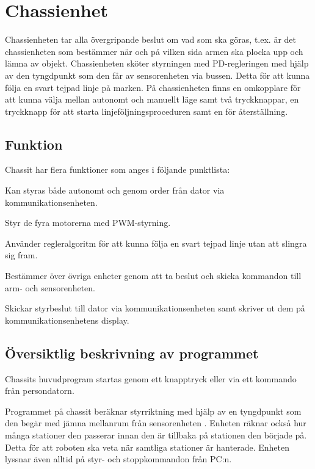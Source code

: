 \section{Chassienhet}
Chassienheten tar alla övergripande beslut om vad som ska göras, t.ex. är det chassienheten som bestämmer när och på vilken sida armen ska plocka upp och lämna av objekt. Chassienheten sköter styrningen med PD-regleringen med hjälp av den tyngdpunkt som den får av sensorenheten via bussen. Detta för att kunna följa en svart tejpad linje på marken. På chassienheten finns en omkopplare för att kunna välja mellan autonomt och manuellt läge samt två tryckknappar, en tryckknapp för att starta linjeföljningsproceduren samt en för återställning. 

\subsection{Funktion}

Chassit har flera funktioner som anges i följande punktlista:
\begin{packed_itemize}
\item Kan styras både autonomt och genom order från dator via kommunikationsenheten.
\item Styr de fyra motorerna med PWM-styrning.
\item Använder regleralgoritm för att kunna följa en svart tejpad linje utan att slingra sig fram.
\item Bestämmer över övriga enheter genom att ta beslut och skicka kommandon till arm- och sensorenheten.
\item Skickar styrbeslut till dator via kommunikationsenheten samt skriver ut dem på kommunikationsenhetens display.
\end{packed_itemize}

\subsection{Översiktlig beskrivning av programmet}

Chassits huvudprogram startas genom ett knapptryck eller via ett kommando från persondatorn. 

Programmet på chassit beräknar styrriktning med hjälp av en tyngdpunkt som den begär med jämna mellanrum från sensorenheten . Enheten räknar också hur många stationer den passerar innan den är tillbaka på stationen den började på. Detta för att roboten ska veta när samtliga stationer är hanterade. Enheten lyssnar även alltid på styr- och stoppkommandon från PC:n.

